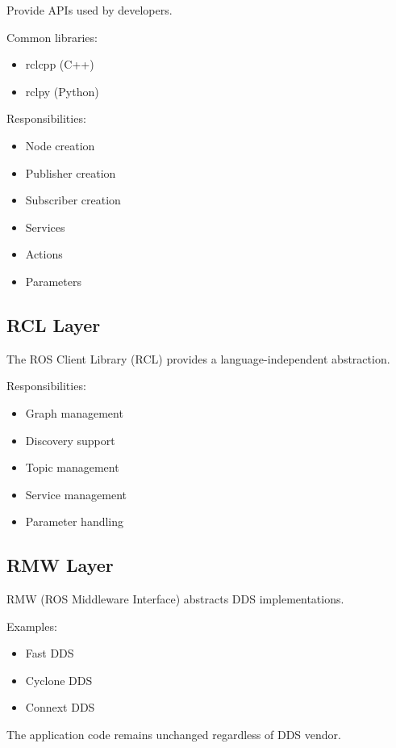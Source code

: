 \documentclass[11pt]{article}
\begin{document}
Provide APIs used by developers.

Common libraries:

\begin{itemize}
\item rclcpp (C++)
\item rclpy (Python)
\end{itemize}

Responsibilities:

\begin{itemize}
\item Node creation
\item Publisher creation
\item Subscriber creation
\item Services
\item Actions
\item Parameters
\end{itemize}

\subsection{RCL Layer}

The ROS Client Library (RCL) provides a language-independent abstraction.

Responsibilities:

\begin{itemize}
\item Graph management
\item Discovery support
\item Topic management
\item Service management
\item Parameter handling
\end{itemize}

\subsection{RMW Layer}

RMW (ROS Middleware Interface) abstracts DDS implementations.

Examples:

\begin{itemize}
\item Fast DDS
\item Cyclone DDS
\item Connext DDS
\end{itemize}

The application code remains unchanged regardless of DDS vendor.
\end{document}
